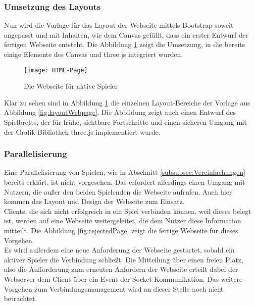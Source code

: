 \subsubsection{Umsetzung des Layouts}

Nun wird die Vorlage für das Layout der Webseite mittels Bootstrap soweit angepasst und mit Inhalten, wie dem Canvas gefüllt, dass ein erster Entwurf der fertigen Webseite entsteht. Die Abbildung \ref{fig:html_page} zeigt die Umsetzung, in die bereits einige Elemente des Canvas und three.js integriert wurden.

\begin{figure}[htp]
	\centering
	\captionsetup{justification=centering}
	\texttt{[image: HTML-Page]}
	\caption[Webseite Index]{Die Webseite für aktive Spieler}
	\label{fig:html_page}
\end{figure}

\clearpage

\noindent Klar zu sehen sind in Abbildung \ref{fig:html_page} die einzelnen Layout-Bereiche der Vorlage aus Abbildung \ref{fig:layoutWebpage}. Die Abbildung zeigt auch einen Entwurf des Spielbretts, der für frühe, sichtbare Fortschritte und einen sicheren Umgang mit der Grafik-Bibliothek three.js implementiert wurde.

\subsubsection{Parallelisierung}

Eine Parallelisierung von Spielen, wie in Abschnitt \ref{subsubsec:Vereinfachungen} bereits erklärt, ist nicht vorgesehen. Das erfordert allerdings einen Umgang mit Nutzern, die außer den beiden Spielenden die Webseite aufrufen. Auch hier kommen das Layout und Design der Webseite zum Einsatz.\\
Clients, die sich nicht erfolgreich in ein Spiel verbinden können, weil dieses belegt ist, werden auf eine Webseite weitergeleitet, die dem Nutzer diese Information mitteilt. Die Abbildung \ref{fig:rejectedPage} zeigt die fertige Webseite für dieses Vorgehen.\\ Es wird außerdem eine neue Anforderung der Webseite gestartet, sobald ein aktiver Spieler die Verbindung schließt. Die Mitteilung über einen freien Platz, also die Aufforderung zum erneuten Anfordern der Webseite erteilt dabei der Webserver dem Client über ein Event der Socket-Kommunikation. Das weitere Vorgehen zum Verbindungsmanagement wird an dieser Stelle noch nicht betrachtet.

